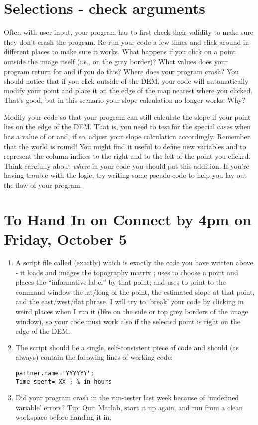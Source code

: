 \documentclass[letterpaper,12pt]{article}
\begin{document}
\section{Selections - check arguments} 
\label{sec:args}

Often with user input, your program has to first check their validity to make sure they don't crash the program. Re-run your code a few times and click around in different places to make sure it works. What happens
if you click on a point outside the image itself (i.e., on the gray border)? What values does your program return for  and  if you do this? Where does your program crash? You should notice that if you click outside of the DEM, your code will automatically modify your point and place it on the edge of the map nearest where you clicked. That's good, but in this scenario your slope calculation no longer works. Why?

Modify your code so that your program can still calculate the slope if your point lies on the edge of the DEM. That is, you need to test for the special cases when  has a value of  or  and, if so, adjust your slope calculation accordingly. Remember that the world is round! You might find it useful to define new variables  and  to represent the column-indices to the right and to the left of the point you clicked. Think carefully about \emph{where} in your code you should put this addition.
If you're having trouble with the logic, try writing some pseudo-code to help you lay out the flow of your program.


\section{To Hand In on Connect by 4pm on Friday, October 5}
 
\begin{enumerate}
\item A script file called (exactly)  which is exactly the code you have written above -  it loads and images the topography matrix ; uses  to choose a point and places the ``informative label'' by that point; and uses  to print to the command window the lat/long of the point, the estimated slope at that point, and the east/west/flat phrase.  I will try to `break' your code by clicking in weird places when I run it (like on the side or top grey borders of the image window), so your code must work also if the selected point is right on the edge of the DEM.

\item The script  should be a single, self-consistent piece of code and should (as always) contain the following  lines of working code:
\begin{lstlisting}
partner.name='YYYYYY';
Time_spent= XX ; % in hours
\end{lstlisting}

\item Did your program crash in the run-tester last week because of `undefined variable' errors? Tip: Quit Matlab, start it up again, and run  from a clean workspace before handing it in. 
\end{enumerate}
\end{document}
